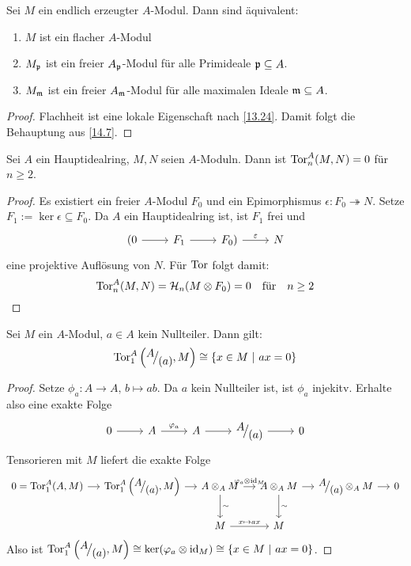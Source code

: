 \begin{fo}\label{14.8}
	Sei $M$ ein endlich erzeugter $A$-Modul. Dann sind äquivalent:
	\begin{enumerate}[label = \roman*)]
		\item $M$ ist ein flacher $A$-Modul
		\item $M_{\mathfrak{p}}$ ist ein freier $A_{\mathfrak{p}}$-Modul für alle Primideale $\mathfrak{p}\subseteq A$.
		\item $M_{\mathfrak{m}}$ ist ein freier $A_{\mathfrak{m}}$-Modul für alle maximalen Ideale $\mathfrak{m}\subseteq A$.
	\end{enumerate}
\end{fo}
\begin{proof}
	Flachheit ist eine lokale Eigenschaft nach \ref{13.24}. Damit folgt die Behauptung aus \ref{14.7}.
\end{proof}
\begin{sa}\label{14.9}
	Sei $A$ ein Hauptidealring, $M,N$ seien $A$-Moduln. Dann ist $\text{Tor}_n^A(M,N) = 0$ für $n\geq 2$.
\end{sa}
\begin{proof}
	Es existiert ein freier $A$-Modul $F_0$ und ein Epimorphismus $\epsilon:F_0 \twoheadrightarrow N$. Setze $F_1:= \ker \epsilon \subseteq F_0$. Da $A$ ein Hauptidealring ist, ist $F_1$ frei und 
	$$\begin{tikzcd}
	(0 \arrow{r} & F_1 \arrow{r} & F_0) \arrow{r}{\epsilon} & N
	\end{tikzcd}$$
	eine projektive Auflösung von $N$. Für $\text{Tor}$ folgt damit:
	$$\text{Tor}_n^A(M,N) = \mathcal{H}_n(M \otimes F_0) = 0\quad \text{für} \quad n\geq 2$$
\end{proof}
\begin{bem}\label{14.10}
	Sei $M$ ein $A$-Modul, $a\in A$ kein Nullteiler. Dann gilt:
	$$\Tor_1^A\left( \QR{A}{(a)} , M \right) \cong \{x\in M \ | \ ax=0\}$$
\end{bem}
\begin{proof}
	Setze $\phi_a:A \to A, \, b \mapsto ab$. Da $a$ kein Nullteiler ist, ist $\phi_a$ injekitv. Erhalte also eine exakte Folge
	$$\begin{tikzcd}
	0 \arrow{r} & A \arrow{r}{\phi_a} & A \arrow{r} & \QR{A}{(a)} \arrow{r} & 0
	\end{tikzcd}$$
	Tensorieren mit $M$ liefert die exakte Folge
	$$\begin{tikzcd}[column sep = small]
	0=\Tor_1^A(A,M) \arrow{r} & \Tor_1^A\left( \QR{A}{(a)}, M\right)\arrow{r} & A \otimes_A M \arrow{d}{\sim} \arrow{r}{\phi_a \otimes \id_M} & \arrow{d}{\sim} A \otimes_A M \arrow{r} & \QR{A}{(a)} \otimes_AM\arrow{r} & 0\\
	& & M \arrow{r}{x\mapsto ax} & M & &
	\end{tikzcd}$$
	Also ist $\Tor_1^A\left(\QR{A}{(a)}, M\right)\cong \ker(\phi_a \otimes \id_M) \cong \{x\in M \ | \ ax=0 \}$.
\end{proof}
\newpage
